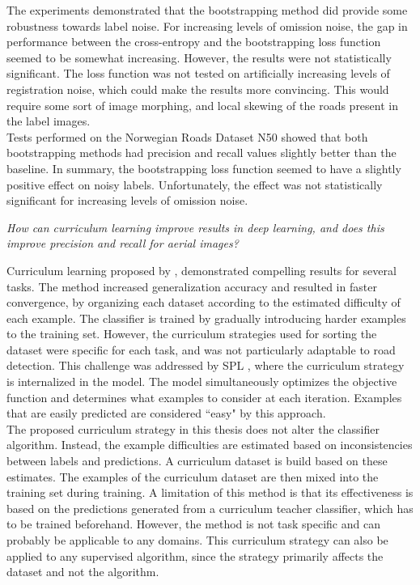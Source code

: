 The experiments demonstrated that the bootstrapping method did provide some robustness towards label noise. For increasing levels of omission noise, the gap in performance between the cross-entropy and the bootstrapping loss function seemed to be somewhat increasing. However, the results were not statistically significant. The loss function was not tested on artificially increasing levels of registration noise, which could make the results more convincing. This would require some sort of image morphing, and local skewing of the roads present in the label images. \\

Tests performed on the Norwegian Roads Dataset N50 showed that both bootstrapping methods had precision and recall values slightly better than the baseline. In summary, the bootstrapping loss function seemed to have a slightly positive effect on noisy labels. Unfortunately, the effect was not statistically significant for increasing levels of omission noise. 

\begin{description}[ style=nextline, leftmargin=1.5em, rightmargin=1.5em]
\item[Research question 2:]{\it How can curriculum learning improve results in deep learning, and does this improve precision and recall for aerial images?}
\end{description}

Curriculum learning proposed by \cite{Bengio_curriculumlearning}, demonstrated compelling results for several tasks. The method increased generalization accuracy and resulted in faster convergence, by organizing each dataset according to the estimated difficulty of each example. The classifier is trained by gradually introducing harder examples to the training set. However, the curriculum strategies used for sorting the dataset were specific for each task, and was not particularly adaptable to road detection. This challenge was addressed by \ac{SPL} \citep{Kumar_self_paced_learning}, where the curriculum strategy is internalized in the model. The model simultaneously optimizes the objective function and determines what examples to consider at each iteration. Examples that are easily predicted are considered ``easy" by this approach.\\

The proposed curriculum strategy in this thesis does not alter the classifier algorithm. Instead, the example difficulties are estimated based on inconsistencies between labels and predictions. A curriculum dataset is build based on these estimates. The examples of the curriculum dataset are then mixed into the training set during training. A limitation of this method is that its effectiveness is based on the predictions generated from a curriculum teacher classifier, which has to be trained beforehand. However, the method is not task specific and can probably be applicable to any domains. This curriculum strategy can also be applied to any supervised algorithm, since the strategy primarily affects the dataset and not the algorithm. \\

